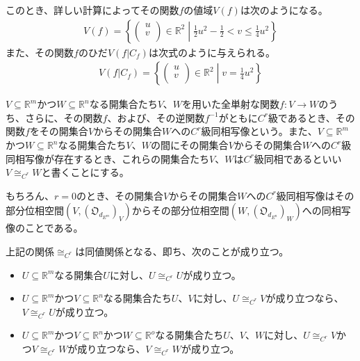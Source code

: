 \documentclass[dvipdfmx]{jsarticle}
\begin{document}
このとき、詳しい計算によってその関数$f$の値域$V(f)$は次のようになる。
\begin{align*}
V(f) = \left\{ \begin{pmatrix}
u \\
v \\
\end{pmatrix} \in \mathbb{R}^{2} \middle| \frac{1}{2}u^{2} - \frac{1}{2} < v \leq \frac{1}{4}u^{2} \right\}
\end{align*}
また、その関数$f$のひだ$V\left( f|C_{f} \right)$は次式のように与えられる。
\begin{align*}
V\left( f|C_{f} \right) = \left\{ \begin{pmatrix}
u \\
v \\
\end{pmatrix} \in \mathbb{R}^{2} \middle| v = \frac{1}{4}u^{2} \right\}
\end{align*}
\begin{dfn}
$V \subseteq \mathbb{R}^{m}$かつ$W \subseteq \mathbb{R}^{n}$なる開集合たち$V$、$W$を用いた全単射な関数$f:V \rightarrow W$のうち、さらに、その関数$f$、および、その逆関数$f^{- 1}$がともに$C^{r}$級であるとき、その関数$f$をその開集合$V$からその開集合$W$への$C^{r}$級同相写像という。また、$V \subseteq \mathbb{R}^{m}$かつ$W \subseteq \mathbb{R}^{n}$なる開集合たち$V$、$W$の間にその開集合$V$からその開集合$W$への$C^{r}$級同相写像が存在するとき、これらの開集合たち$V$、$W$は$C^{r}$級同相であるといい$V \cong_{C^{r}}W$と書くことにする。
\end{dfn}\par
もちろん、$r = 0$のとき、その開集合$V$からその開集合$W$への$C^{r}$級同相写像はその部分位相空間$\left( V,\left( \mathfrak{O}_{d_{E^{m}}} \right)_{V} \right)$からその部分位相空間$\left( W,\left( \mathfrak{O}_{d_{E^{n}}} \right)_{W} \right)$への同相写像のことである。
\begin{thm}\label{4.4.2.2}
上記の関係$\cong_{C^{r}}$は同値関係となる、即ち、次のことが成り立つ。
\begin{itemize}
\item
  $U \subseteq \mathbb{R}^{m}$なる開集合$U$に対し、$U \cong_{C^{r}}U$が成り立つ。
\item
  $U \subseteq \mathbb{R}^{m}$かつ$V \subseteq \mathbb{R}^{n}$なる開集合たち$U$、$V$に対し、$U \cong_{C^{r}}V$が成り立つなら、$V \cong_{C^{r}}U$が成り立つ。
\item
  $U \subseteq \mathbb{R}^{m}$かつ$V \subseteq \mathbb{R}^{n}$かつ$W \subseteq \mathbb{R}^{o}$なる開集合たち$U$、$V$、$W$に対し、$U \cong_{C^{r}}V$かつ$V \cong_{C^{r}}W$が成り立つなら、$V \cong_{C^{r}}W$が成り立つ。
\end{itemize}
\end{thm}
\end{document}
